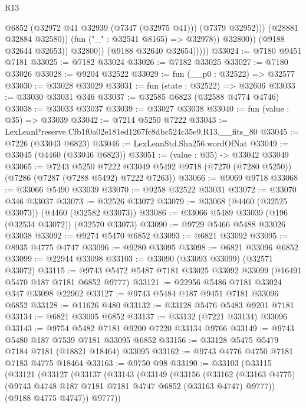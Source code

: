 \begin{lexlean}{R13}
\begin{coremodule}
                              @6852
                              (@32972 @41 @32939 (@7347 (@32975 @41)))
                              (@7379 @32952)))
                          (@28881 @32884 @32580))
                        (fun ("_" : @32541 @8165) => @32978))
                      @32800))
                  (@9188 @32644 @32653))
                @32800))
            (@9188 @32640 @32654)))))
@33024 := @7180 @9451 @7181
@33025 := @7182 @33024
@33026 := @7182 @33025
@33027 := @7180 @33026
@33028 := @9204 @32522
@33029 := fun (__p0 : @32522) => @32577
@33030 := @33028 @33029
@33031 := fun (state : @32522) => @32606
@33033 := @33030 @33031 @346
@33037 := @32585 @6823 (@32588 @4774 @4746)
@33038 := @33033 @33037
@33039 := @33027 @33038
@33040 := fun (value : @35) => @33039
@33042 := @7214 @5250 @7222
@33043 := LexLeanPreserve.Cfb1f0a02e181ed1267fc8dbc524c35e9.R13.__fits_80
@33045 := @7226 (@33043 @6823)
@33046 := LexLeanStd.Sha256.wordOfNat
@33049 := @33045 (@4460 (@33046 @6823))
@33051 := (value : @35) -> @33042 @33049
@33065 := @7243
    @5250
    @7222
    @33049
    @5492
    @9718
    (@7270 (@7280 @5250))
    (@7286 (@7287 (@7288 @5492) @7222 @7263))
@33066 := @9069 @9718
@33068 := @33066 @5490 @33039
@33070 := @9258 @32522 @33031
@33072 := @33070 @346 @33037
@33073 := @32526 @33072
@33079 := @33068 (@4460 (@32525 @33073)) (@4460 (@32582 @33073))
@33086 := @33066 @5489 @33039 (@196 (@32534 @33072)) (@32570 @33073)
@33090 := @9729 @5466 @5488 @33026 @33038
@33092 := @9274 @5470 @6852
@33093 := @6821 @33092
@33095 := @8935 @4775 @4747
@33096 := @9280 @33095
@33098 := @6821 @33096 @6852
@33099 := @22944 @33098
@33103 := @33090 (@33093 @33099) (@32571 @33072)
@33115 := @9743 @5472 @5487 @7181 @33025 @33092 @33099 (@16491 @5470 @187 @7181 @6852 @9777)
@33121 := @22956 @5486 @7181 @33024 @347 @33098 @22962
@33127 := @9743 @5484 @187 @9451 @7181 @33096 @6852
@33128 := @11626 @480
@33132 := @33128 @5476 @5483 @9201 @7181
@33134 := @6821 @33095 @6852
@33137 := @33132 (@7221 @33134) @33096
@33143 := @9754 @5482 @7181 @9200 @7220 @33134 @9766
@33149 := @9743 @5480 @187 @7539 @7181 @33095 @6852
@33156 := @33128 @5475 @5479 @7184 @7181 (@18821 @18464) @33095
@33162 := @9743 @4776 @4750 @7181 @7183 @4775 @18464
@33163 := @9750 @98
@33190 := @33103
    (@33115
      (@33121
        (@33127
          (@33137
            (@33143
              (@33149
                (@33156
                  (@33162
                    (@33163 @4775)
                    (@9743 @4748 @187 @7181 @7181 @4747 @6852 (@33163 @4747) @9777))
                  (@9188 @4775 @4747))
                @9777))

\end{coremodule}
\end{lexlean}
